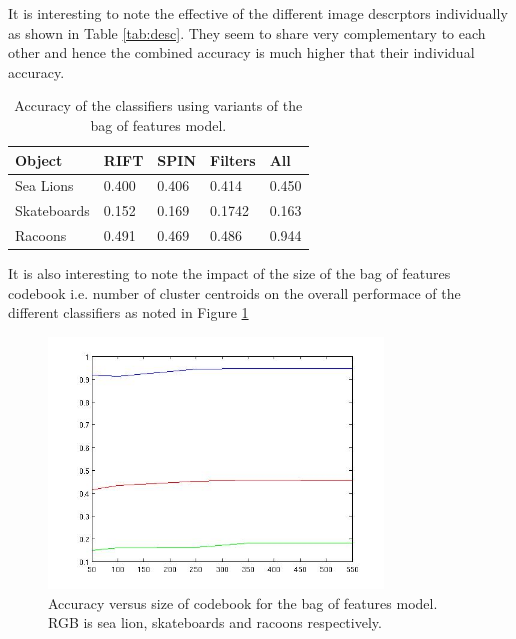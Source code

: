 \documentclass[10pt,twocolumn,letterpaper]{article}
\begin{document}
It is interesting to note the effective of the different image descrptors individually as shown in
Table \ref{tab:desc}. They seem to share very complementary to each other and hence the combined accuracy
is much higher that their individual accuracy.
 
 \begin{table}
   \begin{center}
    \begin{tabular}{ | l | l | l | l | l |}
    \hline
    \textbf{Object} & \textbf{RIFT} & \textbf{SPIN} & \textbf{Filters} & \textbf{All}  \\ \hline
    Sea Lions & 0.400 & 0.406 & 0.414 &  0.450 \\ \hline
    Skateboards & 0.152 & 0.169 & 0.1742 & 0.163 \\ \hline
    Racoons & 0.491 & 0.469 & 0.486 & 0.944 \\ \hline
    \end{tabular}
    \caption{Accuracy of the classifiers using variants of the bag of features model.}
    \label{tab:acc_bw}
    \end{center}
  \end{table}


It is also interesting to note the impact of the size of the bag of features codebook i.e. number of
cluster centroids on the overall
performace of the different classifiers as noted in Figure \ref{fig:code_size}

\begin{figure}[t]
    \includegraphics[width=3.5in]{codebook_size.jpg}
   \caption{Accuracy versus size of codebook for the bag of features model. RGB is sea lion, skateboards and racoons respectively.}
   \label{fig:code_size}
\end{figure}
\end{document}
